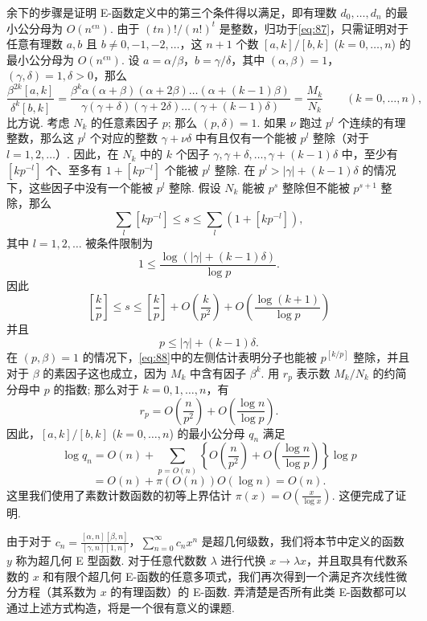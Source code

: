 余下的步骤是证明 E-函数定义中的第三个条件得以满足，即有理数 $d_0,\dots,d_n$ 的最小公分母为 $O(n^{\epsilon n})$. 由于 $(tn)!/(n!)^t$ 是整数，归功于\eqref{eq:87}，只需证明对于任意有理数 $a,b$ 且 $b \neq 0,-1,-2,\dots$，这 $n+1$ 个数 $[a,k] / [b,k]$ ($k=0,\dots,n$) 的最小公分母为 $O(n^{\epsilon n})$. 设 $a=\alpha/\beta$，$b=\gamma/\delta$，其中 $(\alpha,\beta)=1$，$(\gamma,\delta)=1, \delta>0$，那么
\[\frac{\beta^{2k}[a,k]}{\delta^{k}[b,k]} = \frac{\beta^{k}\alpha(\alpha+\beta) (\alpha+2\beta)\dots(\alpha+(k-1)\beta)}{\gamma(\gamma+\delta) (\gamma+2\delta)\dots(\gamma+(k-1)\delta)} = \frac{M_{k}}{N_{k}} \qquad (k=0,\dots,n),\]
比方说. 考虑 $N_k$ 的任意素因子 $p$; 那么 $(p,\delta)=1$. 如果 $\nu$ 跑过 $p^l$ 个连续的有理整数，那么这 $p^l$ 个对应的整数 $\gamma+\nu\delta$ 中有且仅有一个能被 $p^l$ 整除（对于 $l=1,2,\dots$）. 因此，在 $N_k$ 中的 $k$ 个因子 $\gamma,\gamma+\delta,\dots,\gamma+(k-1)\delta$ 中，至少有 $[kp^{-l}]$ 个、至多有 $1+[kp^{-l}]$ 个能被 $p^l$ 整除. 在 $p^l > |\gamma|+(k-1)\delta$ 的情况下，这些因子中没有一个能被 $p^l$ 整除. 假设 $N_k$ 能被 $p^s$ 整除但不能被 $p^{s+1}$ 整除，那么
\[\sum_{l} [kp^{-l}] \le s \le \sum_{l} (1+[kp^{-l}]),\]
其中 $l=1,2,\dots$ 被条件限制为
\[1 \le \frac{\log (|\gamma| + (k-1)\delta)}{\log p}.\]
因此
\begin{equation}
\left[\frac{k}{p}\right] \le s \le \left[\frac{k}{p}\right] + O\left(\frac{k}{p^{2}}\right) + O\left(\frac{\log(k+1)}{\log p}\right) \tag{88}\label{eq:88}
\end{equation}
并且
\[p \le |\gamma| + (k-1)\delta.\]
在 $(p,\beta)=1$ 的情况下，\eqref{eq:88}中的左侧估计表明分子也能被 $p^{[k/p]}$ 整除，并且对于 $\beta$ 的素因子这也成立，因为 $M_k$ 中含有因子 $\beta^k$. 用 $r_p$ 表示数 $M_k/N_k$ 的约简分母中 $p$ 的指数; 那么对于 $k=0,1,\dots,n$，有
\[r_{p} = O\left(\frac{n}{p^{2}}\right) + O\left(\frac{\log n}{\log p}\right).\]
因此，$[a,k] / [b,k]$ ($k=0,\dots,n$) 的最小公分母 $q_n$ 满足
\[\log q_n = O(n) + \sum_{p=O(n)} \left\{ O\left(\frac{n}{p^2}\right) + O\left(\frac{\log n}{\log p}\right) \right\} \log p\]
\[= O(n) + \pi(O(n)) O(\log n) = O(n).\]
这里我们使用了素数计数函数的初等上界估计 $\pi(x) = O\left(\frac{x}{\log x}\right)$. 这便完成了证明.

由于对于 $c_n = \frac{[\alpha, n][\beta, n]}{[\gamma, n][1, n]}$，$\sum_{n=0}^{\infty} c_n x^n$ 是超几何级数，我们将本节中定义的函数 $y$ 称为超几何 E 型函数. 对于任意代数数 $\lambda$ 进行代换 $x \to \lambda x$，并且取具有代数系数的 $x$ 和有限个超几何 E-函数的任意多项式，我们再次得到一个满足齐次线性微分方程（其系数为 $x$ 的有理函数）的 E-函数. 弄清楚是否所有此类 E-函数都可以通过上述方式构造，将是一个很有意义的课题.

